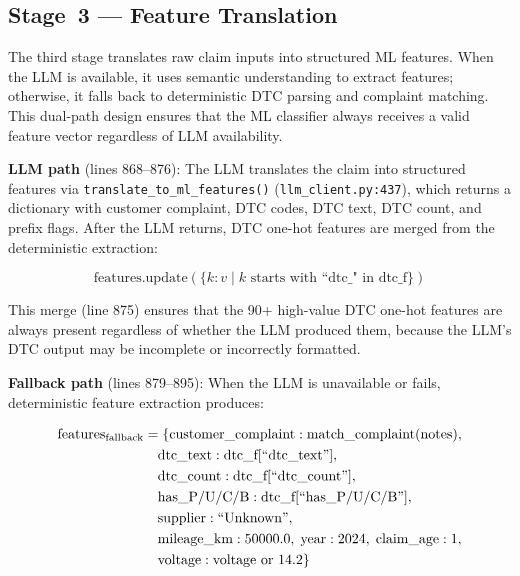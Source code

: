 \documentclass[10pt,a4paper]{article}
\begin{document}
\subsection{Stage~3 --- Feature Translation}
\label{sec:stage3-feature-translation}

The third stage translates raw claim inputs into structured ML features.
When the LLM is available, it uses semantic understanding to extract
features; otherwise, it falls back to deterministic DTC parsing and
complaint matching. This dual-path design ensures that the ML classifier
always receives a valid feature vector regardless of LLM availability.

\textbf{LLM path} (lines 868--876): The LLM translates the
claim into structured features via
\texttt{translate\_to\_ml\_features()}
(\texttt{llm\_client.py:437}), which returns a dictionary with
customer complaint, DTC codes, DTC text, DTC count, and prefix flags.
After the LLM returns, DTC one-hot features are merged from the
deterministic extraction:

\begin{equation}
\text{features}.\text{update}(\{k: v \mid k \text{ starts with ``dtc\_"} \text{ in dtc\_f}\})
\label{eq:stage3-merge}
\end{equation}

This merge (line 875) ensures that the 90+ high-value DTC one-hot features are always present regardless of whether the LLM produced them, because the LLM's DTC output may be incomplete or incorrectly formatted.

\textbf{Fallback path} (lines 879--895): When the LLM is unavailable or fails, deterministic feature extraction produces:

\begin{align}
\text{features}_{\text{fallback}} &= \{\text{customer\_complaint}: \text{match\_complaint}(\text{notes}), \notag \\
&\quad \text{dtc\_text}: \text{dtc\_f}[\text{``dtc\_text''}], \notag \\
&\quad \text{dtc\_count}: \text{dtc\_f}[\text{``dtc\_count''}], \notag \\
&\quad \text{has\_P/U/C/B}: \text{dtc\_f}[\text{``has\_P/U/C/B''}], \label{eq:stage3-fallback} \\
&\quad \text{supplier}: \text{``Unknown''}, \notag \\
&\quad \text{mileage\_km}: 50000.0,\; \text{year}: 2024,\; \text{claim\_age}: 1, \notag \\
&\quad \text{voltage}: \text{voltage or } 14.2\} \notag
\end{align}
\end{document}
